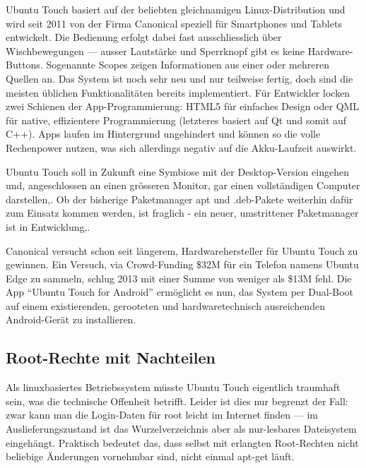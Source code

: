 Ubuntu Touch basiert auf der beliebten gleichnamigen \mbox{Linux-Distribution} und wird seit 2011 von der Firma Canonical speziell für Smartphones und Tablets entwickelt\thinspace\cite{online:ubuntutouch-features}. Die Bedienung erfolgt dabei fast ausschliesslich über Wischbewegungen --- ausser Lautstärke und Sperrknopf gibt es keine Hardware-Buttons\thinspace\cite{online:ubuntutouch-blick}. Sogenannte Scopes zeigen Informationen aus einer oder mehreren Quellen an\thinspace\cite{online:ubuntutouch-scopes}. Das System ist noch sehr neu und nur teilweise fertig, doch sind die meisten üblichen Funktionalitäten bereits implementiert\thinspace\cite{online:ubuntutouch-blick}. Für Entwickler locken zwei Schienen der \mbox{App-Programmierung}: HTML5 für einfaches Design oder QML für native, effizientere Programmierung (letzteres basiert auf Qt und somit auf C++)\thinspace\cite{online:ubuntutouch-developers}. Apps laufen im Hintergrund ungehindert und können so die volle Rechenpower nutzen, was sich allerdings negativ auf die \mbox{Akku-Laufzeit} auswirkt\thinspace\cite{online:ubuntutouch-blick}.

Ubuntu Touch soll in Zukunft eine Symbiose mit der Desktop-Version eingehen und, angeschlossen an einen grösseren Monitor, gar einen vollständigen Computer darstellen\thinspace\cite{online:ubuntutouch-advantages},\thinspace\cite{online:ubuntutouch-edge}. Ob der bisherige Paketmanager apt und .deb-Pakete weiterhin dafür zum Einsatz kommen werden, ist fraglich - ein neuer, umstrittener Paketmanager ist in Entwicklung\thinspace\cite{online:ubuntutouch-snappy},\thinspace\cite{online:ubuntutouch-snappytalk}.

Canonical versucht schon seit längerem, Hardwarehersteller für Ubuntu Touch zu gewinnen. Ein Versuch, via Crowd-Funding \$32M für ein Telefon namens Ubuntu Edge zu sammeln\thinspace\cite{online:ubuntutouch-edge}, schlug 2013 mit einer Summe von weniger als \$13M fehl\thinspace\cite{online:ubuntutouch-edgefail}. Die App ``Ubuntu Touch for Android'' ermöglicht es nun, das System per \mbox{Dual-Boot} auf einem existierenden, gerooteten und hardwaretechnisch ausreichenden \mbox{Android-Gerät} zu installieren.
\newline

\subsection{Root-Rechte mit Nachteilen}
Als linuxbasiertes Betriebssystem müsste Ubuntu Touch eigentlich traumhaft sein, was die technische Offenheit betrifft. Leider ist dies nur begrenzt der Fall: zwar kann man die \mbox{Login-Daten} für root leicht im Internet finden --- im Auslieferungszustand ist das Wurzelverzeichnis aber als \mbox{nur-lesbares} Dateisystem eingehängt. Praktisch bedeutet das, dass selbst mit erlangten Root-Rechten nicht beliebige Änderungen vornehmbar sind, nicht einmal \mbox{apt-get} läuft\thinspace\cite{online:ubuntutouch-aptget}.

